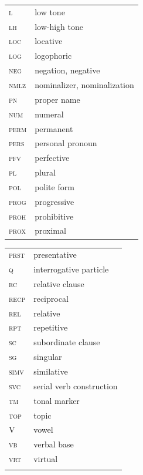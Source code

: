 \documentclass[output=paper,colorlinks=true, citecolor=brown]{langscibook}
\begin{document}
\begin{tabularx}{.5\textwidth}{lQ}
\scshape l & low tone\\ 
\scshape lh & low-high tone\\ 
\scshape loc & locative\\ 
\scshape log & logophoric\\ 
\scshape neg & negation, negative\\ 
\scshape nmlz & nominalizer, nominalization\\ 
\scshape pn & proper name\\ %
\scshape num & numeral\\ 
\scshape perm & permanent\\ 
\scshape pers & personal pronoun\\ 
\scshape pfv & perfective\\ 
\scshape pl & plural\\ 
\scshape pol & polite form\\ 
\scshape prog & progressive\\ 
\scshape proh & prohibitive\\ 
\scshape prox & proximal \\ 
\end{tabularx}
\begin{tabularx}{.5\textwidth}{lQ}
\scshape prst & presentative\\ 
\scshape q & interrogative particle\\ 
\scshape rc & relative clause\\ 
\scshape recp & reciprocal\\ 
\scshape rel & relative\\ 
\scshape rpt & repetitive\\ 
\scshape sc & subordinate clause\\ 
\scshape sg & singular \\ 
\scshape simv & similative\\ 
\scshape svc & serial verb construction\\ 
\scshape tm & tonal marker \\ 
\scshape top & topic \\ 
\scshape V & vowel \\ 
\scshape \textsc{vb} & verbal base \\ 
\scshape vrt & virtual \\
\\
\end{tabularx}


\sloppy\printbibliography[heading=subbibliography,notkeyword=this]
\end{document}

